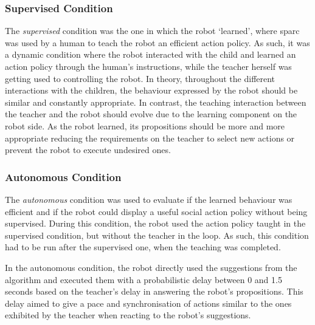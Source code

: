 

\subsubsection{Supervised Condition}

The \textit{supervised} condition was the one in which the robot `learned', where \gls{sparc} was used by a human to teach the robot an efficient action policy. As such, it was a dynamic condition where the robot interacted with the child and learned an action policy through the human's instructions, while the teacher herself was getting used to controlling the robot. In theory, throughout the different interactions with the children, the behaviour expressed by the robot should be similar and constantly appropriate. In contrast, the teaching interaction between the teacher and the robot should evolve due to the learning component on the robot side. As the robot learned, its propositions should be more and more appropriate reducing the requirements on the teacher to select new actions or prevent the  robot to execute undesired ones.

\subsubsection{Autonomous Condition}

The \textit{autonomous} condition was used to evaluate if the learned behaviour was efficient and if the robot could display a useful social action policy without being supervised. During this condition, the robot used the action policy taught in the supervised condition, but without the teacher in the loop. As such, this condition had to be run after the supervised one, when the teaching was completed. %

In the autonomous condition, the robot directly used the suggestions from the algorithm and executed them with a probabilistic delay between 0 and 1.5 seconds based on the teacher's delay in answering the robot's propositions. This delay aimed to give a pace and synchronisation of actions similar to the ones exhibited by the teacher when reacting to the robot's suggestions.


